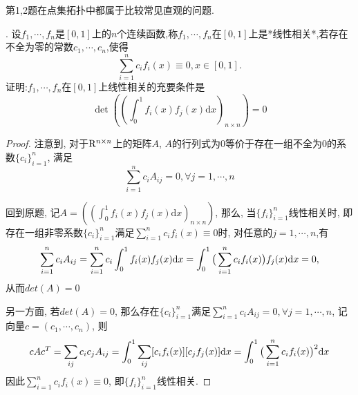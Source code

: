 \documentclass[a4paper,12pt]{article}
\begin{document}
第1,2题在点集拓扑中都属于比较常见直观的问题.

. 设$f_1,\cdots,f_n$是$[0,1]$上的$n$个连续函数,称$f_1,\cdots,f_n$在$[0,1]$上是*线性相关*,若存在不全为零的常数$c_1,\cdots,c_n$,使得
\[\sum_{i=1}^{n}c_if_i(x)\equiv0,x\in[0,1].\]
    证明:$f_1,\cdots,f_n$在$[0,1]$上线性相关的充要条件是
    \[\det\left((\int_0^1f_i(x)f_j(x)\mathrm{d}x)_{n\times n}\right)=0\]
\begin{proof}
  注意到, 对于$\mathrm{R}^{n\times n}$上的矩阵$A$, $A$的行列式为$0$等价于存在一组不全为$0$的系数$\{c_i\}_{i=1}^n$, 满足
  \[\sum_{i=1}^nc_iA_{ij}=0,\forall j=1,\cdots,n\]

  回到原题, 记$A=\left((\int_0^1f_i(x)f_j(x)\mathrm{d}x)_{n\times n}\right)$,
  那么, 当$\{f_i\}_{i=1}^n$线性相关时, 即存在一组非零系数$\{c_i\}_{i=1}^n$满足$\sum_{i=1}^n c_if_i(x)\equiv 0$时,
  对任意的$j=1,\cdots,n$,有
  \[\sum_{i=1}^nc_iA_{ij}=\sum_{i=1}^nc_i\int_0^1f_i(x)f_j(x)\mathrm{d} x=\int_0^1\big(\sum_{i=1}^nc_if_i(x)\big)f_j(x)\mathrm{d} x=0,\]
  从而$det(A)=0$

  另一方面, 若$det(A)=0$, 那么存在$\{c_i\}_{i=1}^n$满足$\sum_{i=1}^nc_iA_{ij}=0,\forall j=1,\cdots,n$,
  记向量$c=(c_1,\cdots,c_n)$, 则
  \[cAc^T=\sum_{ij}c_ic_jA_{ij}=\int_0^1\sum_{ij}[c_if_i(x)][c_jf_j(x)]\mathrm{d} x=\int_0^1\big(\sum_{i=1}^nc_if_i(x)\big)^2\mathrm{d} x\]
  因此$\sum_{i=1}^nc_if_i(x)\equiv0$, 即$\{f_i\}_{i=1}^n$线性相关.
\end{proof}
\end{document}
